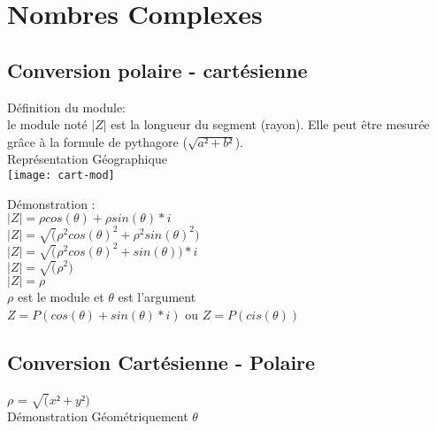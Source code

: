 \newpage
\chapter{Nombres Complexes}
\vspace{3mm} %
\section{Conversion polaire - cartésienne}
\vspace{3mm} %

Définition du module: \\

le module noté $|Z|$ est la longueur du segment (rayon). Elle peut être mesurée  grâce à la formule de pythagore ($\sqrt{a²+b²}$). \\


\vspace{5mm} %
Représentation Géographique \\

\texttt{[image: cart-mod]}
\vspace{2mm} %

Démonstration : \\

$|Z| = \rho cos(\theta)+ \rho sin(\theta) *i$ \\
$|Z| = \sqrt(\rho^{2} cos(\theta)^{2}+ \rho^{2} sin(\theta)^{2})$ \\
$|Z| = \sqrt(\rho^{2} cos(\theta)^{2}+ sin(\theta))*i $ \\
$|Z| = \sqrt(\rho^{2}) $ \\
$|Z| = \rho $ \\

$\rho$ est le module et $\theta$ est l'argument \\
$Z= P(cos(\theta) + sin(\theta)*i )$ ou $Z= P(cis(\theta))$\\

\newpage

\section{Conversion Cartésienne - Polaire}
\vspace{3mm} %

$\rho$ = $\sqrt(x²+y²)$ \\

Démonstration Géométriquement $\theta$ \\

